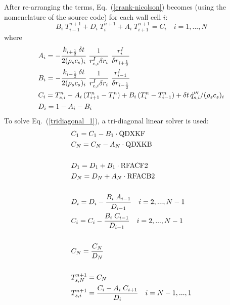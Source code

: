 After re-arranging the terms, Eq.~(\ref{crank-nicolson}) becomes (using the nomenclature of the source code) for each wall cell $i$:
 \begin{equation}
\label{tridiagonal_1}
  B_i \; T_{i-1}^{n+1} + D_i \; T_{i}^{n+1} + A_i \; T_{i+1}^{n+1} = C_i \quad i=1,...,N
\end{equation}
where
\begin{equation}
\label{tridiagonal_2}
\begin{split}
& A_i = -\frac{k_{i+\frac{1}{2}} \, \delta t}{2(\rho_s c_s)_i} \; \frac{1}{r_{c,i}^I \delta r_i} \; \frac{r_{i}^I}{\delta r_{i+\frac{1}{2}}}  \\
& B_i = -\frac{k_{i-\frac{1}{2}} \, \delta t}{2(\rho_s c_s)_i} \; \frac{1}{r_{c,i}^I \delta r_i} \; \frac{r_{i-1}^I}{\delta r_{i-\frac{1}{2}}}   \\
& C_i = T_{s,i}^{n}-A_i \, (T_{i+1}^n-T_i^n) + B_i \, (T_{i}^n-T_{i-1}^n) + \delta t \, \dot{q}_{s,i}'''/(\rho_s c_s)_i \\
& D_i = 1-A_i-B_i
\end{split}
\end{equation}
To solve Eq.~(\ref{tridiagonal_1}), a tri-diagonal linear solver is used:
\begin{equation}
\begin{split}
& C_1 = C_1 - B_1 \cdot \hbox{\ct{QDXKF}} \\
& C_N = C_N - A_N \cdot \hbox{\ct{QDXKB}} \\
& \\
& D_1 = D_1 + B_1 \cdot \hbox{\ct{RFACF2}} \\
& D_N = D_N + A_N \cdot \hbox{\ct{RFACB2}} \\
& \\
& D_i = D_i - \frac{B_i \; A_{i-1}}{D_{i-1}} \quad i = 2, ..., N-1 \\
& C_i = C_i - \frac{B_i \; C_{i-1}}{D_{i-1}} \quad i = 2, ..., N-1\\
& \\
& C_N = \frac{C_N}{D_N} \\
& \\
& T^{n+1}_{s,N} = C_N \\
& T^{n+1}_{s,i} = \frac{C_i - A_i \; C_{i+1}}{D_i} \quad i = N-1,..., 1
\end{split}
\end{equation}

